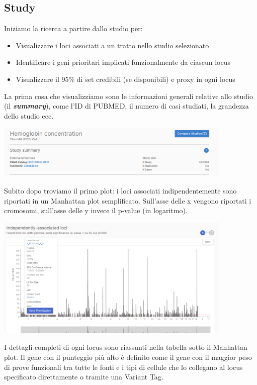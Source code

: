 \documentclass{article}
\begin{document}
\subsection{Study}
\begin{box4}
    [title={\textbf{Ricerca per Studio}}]
    {Iniziamo la ricerca a partire dallo studio per:
    \begin{itemize}
        \item Visualizzare i loci associati a un tratto nello studio selezionato
        \item Identificare i geni prioritari implicati funzionalmente da ciascun locus
        \item Visualizzare il 95\% di set credibili (se disponibili) e proxy in ogni locus
    \end{itemize}}
\end{box4}
La prima cosa che visualizziamo sono le informazioni generali relative allo studio (il \textit{\textbf{summary}}), come l'ID di PUBMED, il numero di casi studiati, la grandezza dello studio ecc.
\begin{center}
    \includegraphics[width=0.85\textwidth]{figures/4-Study.png}
\end{center}
Subito dopo troviamo il primo plot: i loci associati indipendentemente sono riportati in un Manhattan plot semplificato. Sull'asse delle x vengono riportati i cromosomi, sull'asse delle y invece il p-value (in logaritmo).
\begin{center}
    \includegraphics[width=0.85\textwidth]{figures/5-Study.png}
\end{center}
I dettagli completi di ogni locus sono riassunti nella tabella sotto il Manhattan plot. Il gene con il punteggio più alto è definito come il gene con il maggior peso di prove funzionali tra tutte le fonti e i tipi di cellule che lo collegano al locus specificato direttamente o tramite una Variant Tag. 
\end{document}
